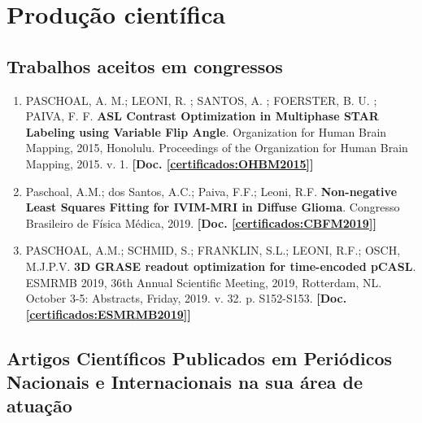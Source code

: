 \documentclass[a4paper,oneside,10pt]{article}
\begin{document}
\newpage
\section{Produção científica}
\subsection{Trabalhos aceitos em congressos}
\vspace{0.3cm}

\begin{enumerate}
\renewcommand{\labelenumi}{{\large\bfseries\arabic{enumi}.}}

\item 	PASCHOAL, A. M.; LEONI, R. ; SANTOS, A. ; FOERSTER, B. U. ; PAIVA, F. F.  \textbf{ASL Contrast Optimization in Multiphase STAR Labeling using Variable Flip Angle}. Organization for Human Brain Mapping, 2015, Honolulu. Proceedings of the Organization for Human Brain Mapping, 2015. v. 1. \textbf{[Doc. \ref{certificados:OHBM2015}]}

\item Paschoal, A.M.; dos Santos, A.C.; Paiva, F.F.; Leoni, R.F. \textbf{Non-negative Least Squares Fitting for IVIM-MRI in Diffuse Glioma}. Congresso Brasileiro de Física Médica, 2019. \textbf{[Doc. \ref{certificados:CBFM2019}]}

\item PASCHOAL, A.M.; SCHMID, S.; FRANKLIN, S.L.; LEONI, R.F.; OSCH, M.J.P.V. \textbf{3D GRASE readout optimization for time-encoded pCASL}. ESMRMB 2019, 36th Annual Scientific Meeting, 2019, Rotterdam, NL. October 3-5: Abstracts, Friday, 2019. v. 32. p. S152-S153. \textbf{[Doc. \ref{certificados:ESMRMB2019}]}

\end{enumerate}

\subsection{Artigos Científicos Publicados em Periódicos Nacionais e Internacionais na sua área de atuação}
\vspace{0.3cm}
\end{document}
